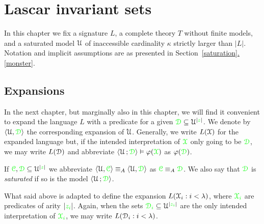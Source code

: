 \documentclass[creche.tex]{subfiles}
\begin{document}
\chapter{Lascar invariant sets}
\label{invariantL}


\def\medrel#1{\parbox[t]{6ex}{$\displaystyle\hfil #1$}}
\def\ceq#1#2#3{\parbox[t]{18ex}{$\displaystyle #1$}\medrel{#2}{$\displaystyle #3$}}

\def\mr{\color{brown}}
\def\gr{\color{green}}


In this chapter we fix a signature $L$, a complete theory $T$ without finite models, and a saturated model $\EuScript U$ of inaccessible cardinality $\kappa$ strictly larger than $|L|$. Notation and implicit assumptions are as presented in Section~\hyperref[saturation]{\ref*{saturation}.\ref*{monster}}.


\section{Expansions}
\label{expansions}

\def\ceq#1#2#3{\parbox[t]{16ex}{$\displaystyle #1$}\medrel{#2}{$\displaystyle #3$}}

In the next chapter, but marginally also in this chapter, we will find it convenient to expand the language $L$ with a predicate for a given $\grD\subseteq\U^{|{\gr z}|}$. We denote by $\<\U,\grD\>$ the corresponding expansion of $\EuScript U$. Generally, we write \emph{$L(\EuScript X)$} for the expanded language but, if the intended interpretation of ${\gr\X}$ only going to be $\grD$, we may write \emph{$L(\EuScript D)$} and abbreviate $\<\U\,;\grD\>\models\phi({\gr\X})$ as $\phi(\grD)$. 

If ${\gr\grC},\grD\subseteq\U^{|{\gr z}|}$ we abbreviate $\<\U,{\gr\grC}\>\equiv_A\<\U,\grD\>$ as ${\gr\grC}\equiv_A\grD$. We also say that $\grD$ is \emph{saturated\/} if so is the model $\<\U\,;\grD\>$.

What said above is adapted to define the expansion  \emph{$L(\EuScript X_i:i<\lambda)$}, where ${\gr\X_i}$ are predicates of arity $|{\gr z_i}|$. Again, when the sets ${\gr\D_i}\subseteq\U^{|{\gr z_i}|}$ are the only intended interpretation of  ${\gr\X_i}$, we may write \emph{$L(\EuScript D_i:i<\lambda)$}.

\end{document}
